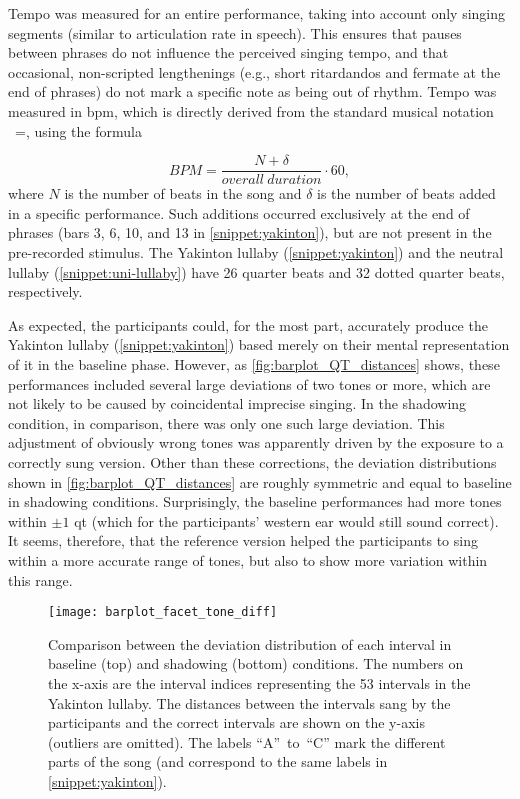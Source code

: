 Tempo was measured for an entire performance, taking into account only singing segments (similar to articulation rate in speech).
This ensures that pauses between phrases do not influence the perceived singing tempo, and that occasional, non-scripted lengthenings (e.g., short ritardandos and fermate at the end of phrases) do not mark a specific note as being out of rhythm.
Tempo was measured in \ac{bpm}, which is directly derived from the standard musical notation \musQuarter~=, using the formula

\begin{equation}
	\label{eq:bpm}
	BPM = \frac{N + \delta}{overall\ duration} \cdot 60,
\end{equation}
\noindent
%
where $N$ is the number of beats in the song and $\delta$ is the number of beats added in a specific performance.
Such additions occurred exclusively at the end of phrases (bars 3, 6, 10, and 13 in \cref{snippet:yakinton}), but are not present in the pre-recorded stimulus.
The Yakinton lullaby (\cref{snippet:yakinton}) and the neutral lullaby (\cref{snippet:uni-lullaby}) have 26 quarter beats and 32 dotted quarter beats, respectively.

As expected, the participants could, for the most part, accurately produce the Yakinton lullaby (\cref{snippet:yakinton}) based merely on their mental representation of it in the baseline phase.
However, as \cref{fig:barplot_QT_distances} shows, these performances included several large deviations of two tones or more, which are not likely to be caused by coincidental imprecise singing.
In the shadowing condition, in comparison, there was only one such large deviation.
This adjustment of obviously wrong tones was apparently driven by the exposure to a correctly sung version.
Other than these corrections, the deviation distributions shown in \cref{fig:barplot_QT_distances} are roughly symmetric and equal to baseline in shadowing conditions.
Surprisingly, the baseline performances had more tones within $\pm1$ \ac{qt} (which for the participants' western ear would still sound correct).
It seems, therefore, that the reference version helped the participants to sing within a more accurate range of tones, but also to show more variation within this range.

\begin{figure}[t]
	\centering
	\texttt{[image: barplot\_facet\_tone\_diff]}
	\caption[Comparison of interval deviation between baseline and shadowing performances]
		{Comparison between the deviation distribution of each interval in baseline (top) and shadowing (bottom) conditions.
		The numbers on the x-axis are the interval indices representing the 53 intervals in the Yakinton lullaby.
		The distances between the intervals sang by the participants and the correct intervals are shown on the y-axis (outliers are omitted).
		The labels \enquote{A}~to~\enquote{C} mark the different parts of the song (and correspond to the same labels in \cref{snippet:yakinton}).}
	\label{fig:barplot_facet_tone_diff}
\end{figure}

